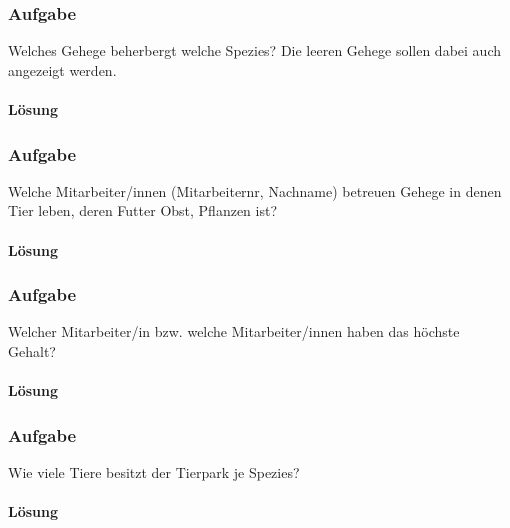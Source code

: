 \subsubsection{Aufgabe}
\label{subsec:uebung_01.aufgabe_10c}
Welches Gehege beherbergt welche Spezies? Die leeren Gehege sollen dabei auch angezeigt werden.

\paragraph*{Lösung}
\label{subsubsec:uebung_01.aufgabe_10c.loesung}

\subsubsection{Aufgabe}
\label{subsec:uebung_01.aufgabe_10d}
Welche Mitarbeiter/innen (Mitarbeiternr, Nachname) betreuen Gehege in denen Tier leben, deren Futter Obst, Pflanzen ist?

\paragraph*{Lösung}
\label{subsubsec:uebung_01.aufgabe_10d.loesung}

\subsubsection{Aufgabe}
\label{subsec:uebung_01.aufgabe_10e}
Welcher Mitarbeiter/in bzw. welche Mitarbeiter/innen haben das höchste Gehalt?

\paragraph*{Lösung}
\label{subsubsec:uebung_01.aufgabe_10e.loesung}

\subsubsection{Aufgabe}
\label{subsec:uebung_01.aufgabe_10f}
Wie viele Tiere besitzt der Tierpark je Spezies?

\paragraph*{Lösung}
\label{subsubsec:uebung_01.aufgabe_10f.loesung}
